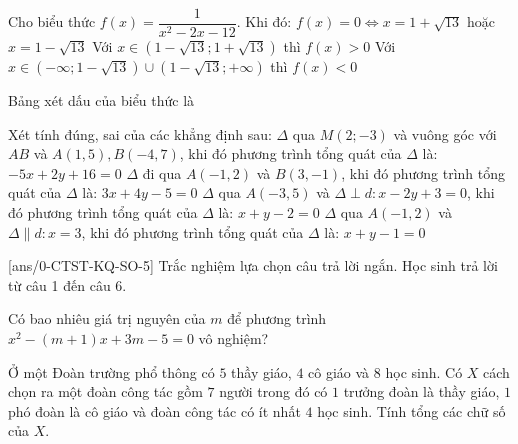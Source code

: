 \begin{ex}%
	Cho biểu thức $f(x)=\dfrac{1}{x^2-2x-12}$. Khi đó:
	\choiceTF
	{$f(x)=0\Leftrightarrow x=1+\sqrt{13}$ hoặc $x=1-\sqrt{13}$}
	{Với $x \in(1-\sqrt{13}; 1+\sqrt{13})$ thì $f(x) > 0$}
	{Với $x \in(-\infty; 1-\sqrt{13}) \cup(1-\sqrt{13};+\infty)$ thì $f(x) < 0$}
	{\True Bảng xét dấu của biểu thức là\\
		}
	\loigiai{
		
	}
\end{ex}
\begin{ex}%
Xét tính đúng, sai của các khẳng định sau:
\choiceTF
{$\Delta$ qua $M(2;-3)$ và vuông góc với $AB$ và $A(1,5), B(-4,7)$, khi đó phương trình tổng quát của $\Delta$ là: $-5x+2y+16=0$}
{$\Delta$ đi qua $A(-1,2)$ và $B(3,-1)$, khi đó phương trình tổng quát của $\Delta$ là: $3x+4y-5=0$}
{$\Delta$ qua $A(-3,5)$ và $\Delta \perp d: x-2y+3=0$, khi đó phương trình tổng quát của $\Delta$ là: $x+y-2=0$}
{$\Delta$ qua $A(-1,2)$ và $\Delta \parallel d: x=3$, khi đó phương trình tổng quát của $\Delta$ là: $x+y-1=0$}
\loigiai{}
\end{ex}


\caukq
{}[ans/0-CTST-KQ-SO-5]
\setcounter{ex}{0}
 Trắc nghiệm lựa chọn câu trả lời ngắn. Học sinh trả lời từ câu 1 đến câu 6.
\begin{ex}%
	Có bao nhiêu giá trị nguyên của $m$ để phương trình $x^{2}-(m+1) x+3 m-5=0$ vô nghiệm?	
	\loigiai{
	}	
\end{ex}

\begin{ex}%
	Ở một Đoàn trường phổ thông có $5$ thầy giáo, $4$ cô giáo và $8$ học sinh. Có $X$ cách chọn ra một đoàn công tác gồm $7$ người trong đó có $1$ trưởng đoàn là thầy giáo, $1$ phó đoàn là cô giáo và đoàn công tác có ít nhất $4$ học sinh. Tính tổng các chữ số của $X$.
	\loigiai{
		
	}
\end{ex}

